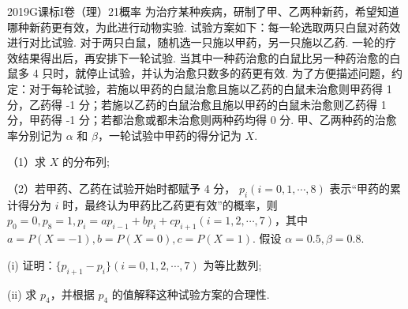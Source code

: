 
\begin{problem}{2019}{G}{课标I卷（理）}{21}{概率}
为治疗某种疾病，研制了甲、乙两种新药，希望知道哪种新药更有效，为此进行动物实验. 试验方案如下：每一轮选取两只白鼠对药效进行对比试验. 对于两只白鼠，随机选一只施以甲药，另一只施以乙药. 一轮的疗效结果得出后，再安排下一轮试验. 当其中一种药治愈的白鼠比另一种药治愈的白鼠多 4 只时，就停止试验，并认为治愈只数多的药更有效. 为了方便描述问题，约定：对于每轮试验，若施以甲药的白鼠治愈且施以乙药的白鼠未治愈则甲药得 1 分，乙药得 -1 分；若施以乙药的白鼠治愈且施以甲药的白鼠未治愈则乙药得 1 分，甲药得 -1 分；若都治愈或都未治愈则两种药均得 0 分. 甲、乙两种药的治愈率分别记为 $\alpha$ 和 $\beta$，一轮试验中甲药的得分记为 $X$.

（1）求 $X$ 的分布列;

（2）若甲药、乙药在试验开始时都赋予 4 分， $p_i(i=0,1,\cdots,8)$ 表示“甲药的累计得分为 $i$ 时，最终认为甲药比乙药更有效”的概率，则 $p_0=0, p_8=1, p_i = ap_{i-1} + b p_i + c p_{i+1}(i=1,2,\cdots,7)$，其中 $a=P(X=-1), b=P(X=0), c=P(X=1)$. 假设 $\alpha=0.5, \beta=0.8$.

(i) 证明：$\{p_{i+1}-p_i\}(i=0,1,2,\cdots,7)$ 为等比数列;

(ii) 求 $p_4$，并根据 $p_4$ 的值解释这种试验方案的合理性.

\end{problem}


